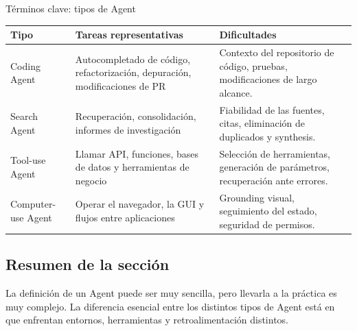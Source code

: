 \begin{knowledgebox}{Términos clave: tipos de Agent}
\begin{tabularx}{\textwidth}{p{}p{}X}
\toprule
Tipo & Tareas representativas & Dificultades \\
\midrule
Coding Agent & Autocompletado de código, refactorización, depuración, modificaciones de PR & Contexto del repositorio de código, pruebas, modificaciones de largo alcance. \\
Search Agent & Recuperación, consolidación, informes de investigación & Fiabilidad de las fuentes, citas, eliminación de duplicados y synthesis. \\
Tool-use Agent & Llamar API, funciones, bases de datos y herramientas de negocio & Selección de herramientas, generación de parámetros, recuperación ante errores. \\
Computer-use Agent & Operar el navegador, la GUI y flujos entre aplicaciones & Grounding visual, seguimiento del estado, seguridad de permisos. \\
\bottomrule
\end{tabularx}
\end{knowledgebox}

\subsection{Resumen de la sección}

La definición de un Agent puede ser muy sencilla, pero llevarla a la práctica es muy complejo. La diferencia esencial entre los distintos tipos de Agent está en que enfrentan entornos, herramientas y retroalimentación distintos.
